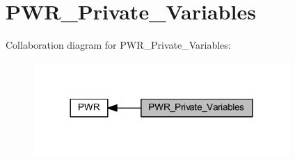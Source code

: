 \hypertarget{group___p_w_r___private___variables}{}\section{P\+W\+R\+\_\+\+Private\+\_\+\+Variables}
\label{group___p_w_r___private___variables}
Collaboration diagram for P\+W\+R\+\_\+\+Private\+\_\+\+Variables\+:
\nopagebreak
\begin{figure}[H]
\begin{center}
\leavevmode
\includegraphics[width=276pt]{group___p_w_r___private___variables}
\end{center}
\end{figure}
